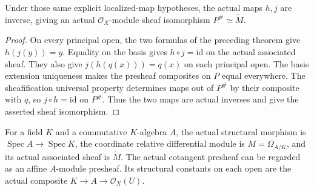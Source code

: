\begin{theorem}
\label{sc0-canonical-port:geom:affine-localized-sheafification-isomorphism}
\leanok
Under those same explicit localized-map hypotheses,
the actual maps \(h,j\) are inverse, giving an actual
\(\mathcal O_X\)-module sheaf isomorphism
\(P^\#\simeq\widetilde M\).
\end{theorem}
\begin{proof}
On every principal open, the two formulas of the
preceding theorem give \(h(j(y))=y\). Equality on the
basis gives \(h\circ j=\mathrm{id}\) on the actual
associated sheaf.
They also give \(j(h(q(x)))=q(x)\) on each principal
open. The basis extension uniqueness makes the
presheaf composites on \(P\) equal everywhere.
The sheafification universal property determines
maps out of \(P^\#\) by their composite with \(q\),
so \(j\circ h=\mathrm{id}\) on \(P^\#\).
Thus the two maps are actual inverses and give the
asserted sheaf isomorphism.
\end{proof}

\begin{definition}
\label{sc0-canonical-port:geom:actual-affine-cotangent-objects}
\leanok
For a field \(K\) and a commutative \(K\)-algebra \(A\),
the actual structural morphism is
\(\operatorname{Spec}A\to\operatorname{Spec}K\),
the coordinate relative differential module is
\(M=\Omega_{A/K}\), and its actual associated sheaf
is \(\widetilde M\). The actual cotangent presheaf
can be regarded as an affine \(A\)-module presheaf.
Its structural constants on each open are the actual
composite \(K\to A\to\mathcal O_X(U)\).
\end{definition}

